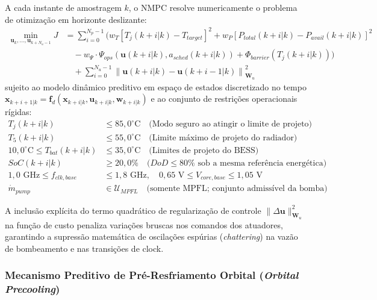 A cada instante de amostragem $k$, o NMPC resolve numericamente o problema de otimização em horizonte deslizante:
\begin{align}
    \min_{\mathbf{u}_k, \dots, \mathbf{u}_{k+N_u-1}} J &= \sum_{i=0}^{N_p-1} \Bigg( 
        w_T \left[ T_j(k+i|k) - T_{target} \right]^2 + 
        w_P \left[ P_{total}(k+i|k) - P_{avail}(k+i|k) \right]^2 \nonumber \\
        &\quad - w_\Psi \cdot \Psi_{ops}\left( \mathbf{u}(k+i|k), a_{sched}(k+i|k) \right) + 
        \Phi_{barrier}\left( T_j(k+i|k) \right) \Bigg) \nonumber \\
        &\quad + \sum_{i=0}^{N_u-1} \left\| \mathbf{u}(k+i|k) - \mathbf{u}(k+i-1|k) \right\|_{\mathbf{W}_u}^2
    \label{eq:problema_otimizacao_nmpc_rigoroso}
\end{align}
sujeito ao modelo dinâmico preditivo em espaço de estados discretizado no tempo $\mathbf{x}_{k+i+1|k} = \mathbf{f}_d(\mathbf{x}_{k+i|k}, \mathbf{u}_{k+i|k}, \mathbf{w}_{k+i|k})$ e ao conjunto de restrições operacionais rígidas:
\begin{align}
    T_j(k+i|k) &\le 85{,}0^\circ\text{C} \quad \text{(Modo seguro ao atingir o limite de projeto)} \label{eq:restricao_hard_tj} \\
    T_5(k+i|k) &\le 55{,}0^\circ\text{C} \quad \text{(Limite máximo de projeto do radiador)} \label{eq:restricao_hard_trad} \\
    10{,}0^\circ\text{C} \le T_{bat}(k+i|k) &\le 35{,}0^\circ\text{C} \quad \text{(Limites de projeto do BESS)} \label{eq:restricao_hard_tbat} \\
    SoC(k+i|k) &\ge 20{,}0\% \quad \text{($DoD\le80\%$ sob a mesma referência energética)} \label{eq:restricao_hard_soc} \\
    1{,}0\text{ GHz} \le f_{clk,base} &\le 1{,}8\text{ GHz}, \quad 0{,}65\text{ V} \le V_{core,base} \le 1{,}05\text{ V} \label{eq:restricao_atuadores_dvfs} \\
    \dot{m}_{pump} &\in \mathcal{U}_{MPFL} \quad \text{(somente MPFL; conjunto admissível da bomba)} \label{eq:restricao_atuadores_bomba}
\end{align}

A inclusão explícita do termo quadrático de regularização de controle $\|\Delta \mathbf{u}\|_{\mathbf{W}_u}^2$ na função de custo penaliza variações bruscas nos comandos dos atuadores, garantindo a supressão matemática de oscilações espúrias (\textit{chattering}) na vazão de bombeamento e nas transições de clock.

\subsubsection{Mecanismo Preditivo de Pré-Resfriamento Orbital (\textit{Orbital Precooling})}

